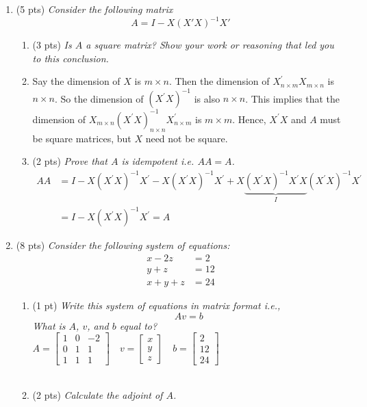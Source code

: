 \documentclass{./../../Latex/tests}
\begin{document}
\begin{enumerate}
\newpage
\item (5 pts) \textit{Consider the following matrix $$A = I - X(X'X)^{-1}X'$$}
\begin{enumerate}
\item (3 pts)  \textit{Is $A$ a square matrix? Show your work or reasoning that led you to this conclusion.}
\item[] Say the dimension of $X$ is \( m \times n \). Then the dimension of \( X_{n \times m}^{\prime} X_{m \times n} \) is \( n \times n \). So the dimension of \( \left(X^{\prime} X\right)^{-1} \) is also  \( n \times n \).  This implies that the dimension of \( X_{m \times n}\left(X^{\prime} X\right)_{n \times n}^{-1} X_{n \times m}^{\prime} \) is \( m \times m \). Hence, \( X^{\prime} X \) and $A$ must be square matrices, but $X$ need not be square. \\
\item (2 pts) \textit{Prove that $A$ is idempotent i.e. $A A = A$.} 
$$
\begin{aligned}
A A &=I-X\left(X^{\prime} X\right)^{-1} X^{\prime}-X\left(X^{\prime} X\right)^{-1} X^{\prime}+X\underbrace{\left(X^{\prime} X\right)^{-1} X^{\prime} X}_{I}\left(X^{\prime} X\right)^{-1} X^{\prime} \\
&=I-X\left(X^{\prime} X\right)^{-1} X^{\prime} = A
\end{aligned}
$$
\end{enumerate} 

\vspace{1cm}

\item (8 pts) \textit{Consider the following system of equations:
}\begin{align*}
x-2z & = 2 \\
y+z & = 12 \\
x+y+z &= 24	
\end{align*}
\begin{enumerate}
  \item (1 pt) \textit{Write this system of equations in matrix format i.e., $$ Av=b $$
  What is $A$, $v$, and $b$ equal to?} \\
  
  $A=\left[\begin{array}{rrr}1 & 0 & -2 \\ 0 & 1 & 1 \\ 1 & 1 & 1\end{array}\right] \quad v=\left[\begin{array}{l}x \\ y \\ z\end{array}\right] \quad b=\left[\begin{array}{c}2 \\ 12 \\ 24\end{array}\right]$ \\~\\
   \item (2 pts) \textit{Calculate the adjoint of $A$. } \\
   

\end{enumerate}
\end{enumerate}
\end{document}
